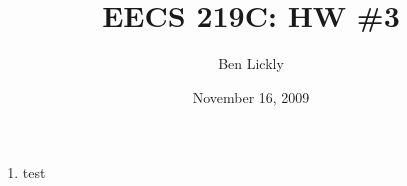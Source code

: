 \documentclass{article}
\title{EECS 219C: HW \#3}
\author{Ben Lickly}
\date{November 16, 2009}
\begin{document}
\maketitle
\begin{enumerate}
\item test
\end{enumerate}

%
%
\end{document}
